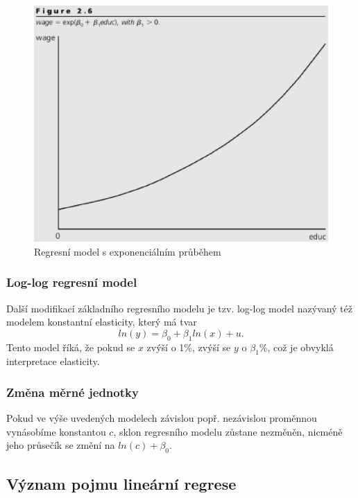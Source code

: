 \begin{figure}[htp]
\centering
\includegraphics[scale = 0.5]{pictures/figure_2_6.eps}
\caption{Regresní model s exponenciálním průběhem}
\label{figure_2_6}
\end{figure} 

\subsubsection{Log-log regresní model}

Další modifikací základního regresního modelu je tzv. log-log model nazývaný též modelem konstantní elasticity, který má tvar
\begin{equation}
ln(y) = \beta_0 + \beta_1 ln(x) + u.
\end{equation}
Tento model říká, že pokud se $x$ zvýší o 1\%, zvýší se $y$ o $\beta_1$\%, což je obvyklá interpretace elasticity.

\subsubsection{Změna měrné jednotky}

Pokud ve výše uvedených modelech závislou popř. nezávislou proměnnou vynásobíme konstantou $c$, sklon regresního modelu zůstane 
nezměněn, nicméně jeho průsečík se změní na $ln(c) + \beta_0$.

\subsection{Význam pojmu lineární regrese}

